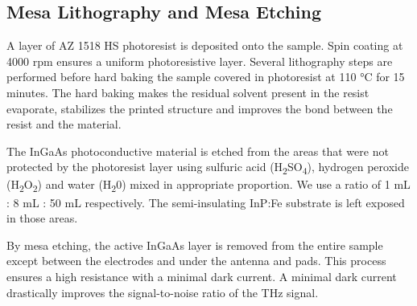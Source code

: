 \subsection{Mesa Lithography and Mesa Etching}

A layer of AZ 1518 HS photoresist is deposited onto the sample. Spin coating at 4000 rpm ensures a uniform photoresistive layer. Several lithography steps are performed before hard baking the sample covered in photoresist at \num{110} \si{\celsius} for \num{15} minutes. The hard baking makes the residual solvent present in the resist evaporate, stabilizes the printed structure and improves the bond between the resist and the material. 

The InGaAs photoconductive material is etched from the areas that were not protected by the photoresist layer using 
sulfuric acid (H\textsubscript{2}SO\textsubscript{4}), hydrogen peroxide (H\textsubscript{2}O\textsubscript{2}) and water (H\textsubscript{2}0) mixed in appropriate proportion. We use a ratio of \num{1} \si{\milli \liter} : \num{8} \si{\milli \liter} : \num{50} \si{\milli \liter} respectively. The semi-insulating InP:Fe substrate is left exposed in those areas. 

By mesa etching, the active InGaAs layer is removed from the entire sample except between the electrodes and under the antenna and pads. This process ensures a high resistance with a minimal dark current. A minimal dark current drastically improves the signal-to-noise ratio of the THz signal. 

